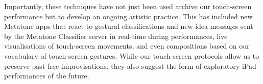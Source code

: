 \documentclass[graybox]{svmult}
\begin{document}
Importantly, these techniques have not just been used archive our
touch-screen performance but to develop an ongoing artistic practice.
This has included new Metatone apps that react to gestural
classifications and new-idea messages sent by the Metatone Classifier
server in real-time during performances, live visualisations of
touch-screen movements, and even compositions based on our vocabulary
of touch-screen gestures. While our touch-screen protocols allow
us to preserve past free-improvisations, they also suggest the form of
exploratory iPad performances of the future.

%

%
%

\end{document}
